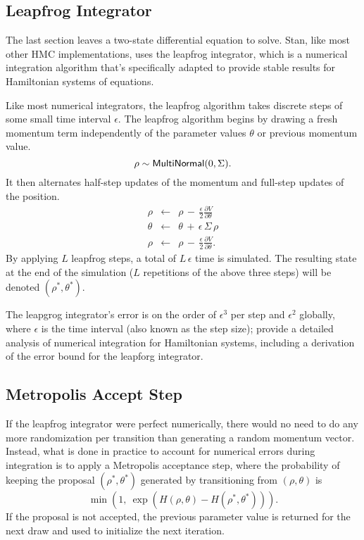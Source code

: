 \subsection{Leapfrog Integrator}

The last section leaves a two-state differential equation to solve.
Stan, like most other HMC implementations, uses the leapfrog
integrator, which is a numerical integration algorithm that's
specifically adapted to provide stable results for Hamiltonian systems
of equations.

Like most numerical integrators, the leapfrog algorithm takes discrete
steps of some small time interval $\epsilon$. The leapfrog algorithm
begins by drawing a fresh momentum term independently of the parameter
values $\theta$ or previous momentum value.
%
\[
\rho \sim \distro{MultiNormal}(0,\Sigma).
\]
It then alternates half-step updates of the momentum and full-step
updates of the position.
%
\vspace*{-6pt}
\begin{eqnarray*}
\rho & \leftarrow 
     & \rho \, - \, \frac{\epsilon}{2} \frac{\partial V}{\partial \theta}
\\[6pt]
\theta & \leftarrow
       & \theta \, + \, \epsilon \, \Sigma \, \rho
\\[6pt]
\rho & \leftarrow 
     & \rho \, - \, \frac{\epsilon}{2} \frac{\partial V}{\partial \theta}.
\end{eqnarray*}
%
By applying $L$ leapfrog steps, a total of $L \, \epsilon$ time is
simulated. The resulting state at the end of the simulation ($L$
repetitions of the above three steps) will be denoted
$(\rho^{*},\theta^{*})$.

The leapgrog integrator's error is on the order of $\epsilon^3$ per
step and $\epsilon^2$ globally, where $\epsilon$ is the time interval
(also known as the step size);  \cite{LeimkuhlerReich:2004} provide a
detailed analysis of numerical integration for Hamiltonian systems,
including a derivation of the error bound for the leapforg
integrator.


\subsection{Metropolis Accept Step}

If the leapfrog integrator were perfect numerically, there would no
need to do any more randomization per transition than generating a
random momentum vector. Instead, what is done in practice to account
for numerical errors during integration is to apply a Metropolis
acceptance step, where the probability of keeping the proposal 
$(\rho^{*},\theta^{*})$ generated by transitioning from $(\rho,\theta)$ is
%
\[
\min\!\left(1, \ \exp\!\left( H(\rho,\theta) - H(\rho^{*},\theta^{*})\right)\right).
\]
%
If the proposal is not accepted, the previous parameter value is
returned for the next draw and used to initialize the next iteration.


